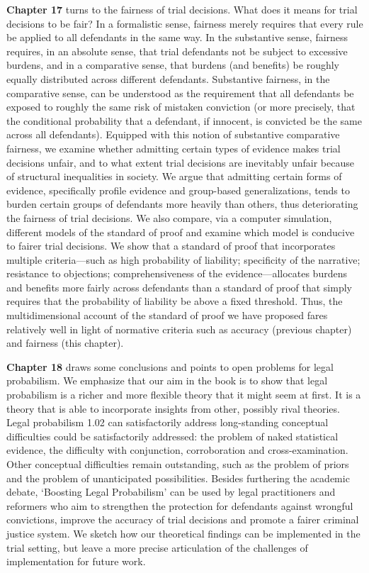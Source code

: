 \documentclass[
  10pt,
  dvipsnames,enabledeprecatedfontcommands]{scrartcl}
\newcommand{\raf}[1]{\todo[color=olive!40]{#1}}
\begin{document}
\textbf{Chapter 17} turns to the fairness of trial decisions. What does
it means for trial decisions to be fair? In a formalistic sense,
fairness merely requires that every rule be applied to all defendants in
the same way. In the substantive sense, fairness requires, in an
absolute sense, that trial defendants not be subject to excessive
burdens, and in a comparative sense, that burdens (and benefits) be
roughly equally distributed across different defendants. Substantive
fairness, in the comparative sense, can be understood as the requirement
that all defendants be exposed to roughly the same risk of mistaken
conviction (or more precisely, that the conditional probability that a
defendant, if innocent, is convicted be the same across all defendants).
Equipped with this notion of substantive comparative fairness, we
examine whether admitting certain types of evidence makes trial
decisions unfair, and to what extent trial decisions are inevitably
unfair because of structural inequalities in society. We argue that
admitting certain forms of evidence, specifically profile evidence and
group-based generalizations, tends to burden certain groups of
defendants more heavily than others, thus deteriorating the fairness of
trial decisions. We also compare, via a computer simulation, different
models of the standard of proof and examine which model is conducive to
fairer trial decisions. We show that a standard of proof that
incorporates multiple criteria---such as high probability of liability;
specificity of the narrative; resistance to objections;
comprehensiveness of the evidence---allocates burdens and benefits more
fairly across defendants than a standard of proof that simply requires
that the probability of liability be above a fixed threshold. Thus, the
multidimensional account of the standard of proof we have proposed fares
relatively well in light of normative criteria such as accuracy
(previous chapter) and fairness (this chapter).
\raf{M: Anythign to add or remove?}

\textbf{Chapter 18} draws some conclusions and points to open problems
for legal probabilism. We emphasize that our aim in the book is to show
that legal probabilism is a richer and more flexible theory that it
might seem at first. It is a theory that is able to incorporate insights
from other, possibly rival theories. Legal probabilism 1.02 can
satisfactorily address long-standing conceptual difficulties could be
satisfactorily addressed: the problem of naked statistical evidence, the
difficulty with conjunction, corroboration and cross-examination. Other
conceptual difficulties remain outstanding, such as the problem of
priors and the problem of unanticipated possibilities. Besides
furthering the academic debate, `Boosting Legal Probabilism' can be used
by legal practitioners and reformers who aim to strengthen the
protection for defendants against wrongful convictions, improve the
accuracy of trial decisions and promote a fairer criminal justice
system. We sketch how our theoretical findings can be implemented in the
trial setting, but leave a more precise articulation of the challenges
of implementation for future work.
\end{document}
